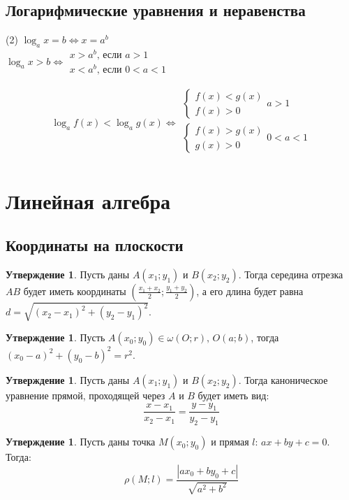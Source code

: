 \documentclass[12pt]{article}
\theoremstyle{definition}
\newtheorem{statement}[theorem]{Утверждение}
\begin{document}
    \subsection{Логарифмические уравнения и неравенства}

    \begin{tasks}(2)
        \task[] $\log_ax=b\Longleftrightarrow x=a^b$\\
        \task[] $\log_ax>b\Longleftrightarrow \begin{array}{l}
            x>a^b\text{, если }a>1\\
            x<a^b\text{, если }0<a<1
        \end{array}$\\
    \end{tasks}
    $$\log_af(x)<\log_ag(x)\Longleftrightarrow
        \begin{array}{l}
            \begin{cases}
                f(x) < g(x)\\
                f(x) > 0
            \end{cases}a>1\\
            \begin{cases}
                f(x) > g(x)\\
                g(x) > 0
            \end{cases}0<a<1\\
        \end{array}$$

\section{Линейная алгебра}

\subsection{Координаты на плоскости}

\begin{statement}
    Пусть даны $A(x_1;y_1)$ и $B(x_2;y_2)$. Тогда середина отрезка $AB$ будет иметь координаты $(\frac{x_1+x_2}{2};\frac{y_1+y_2}{2})$, а его длина будет равна $d=\sqrt{(x_2-x_1)^2+(y_2-y_1)^2}$.
\end{statement}
\begin{statement}
    Пусть $A(x_0;y_0)\in\omega(O;r),\,O(a;b)$, тогда $(x_0-a)^2+(y_0-b)^2=r^2$.
\end{statement}
\begin{statement}
    Пусть даны $A(x_1;y_1)$ и $B(x_2;y_2)$. Тогда каноническое уравнение прямой, проходящей через $A$ и $B$ будет иметь вид:
    $$\frac{x-x_1}{x_2-x_1}=\frac{y-y_1}{y_2-y_1}$$
\end{statement}
\begin{statement}
    Пусть даны точка $M(x_0;y_0)$ и прямая $l:\, ax+by+c=0$. Тогда:
    $$\rho(M;l)=\frac{|ax_0+by_0+c|}{\sqrt{a^2+b^2}}$$
\end{statement}
\end{document}
